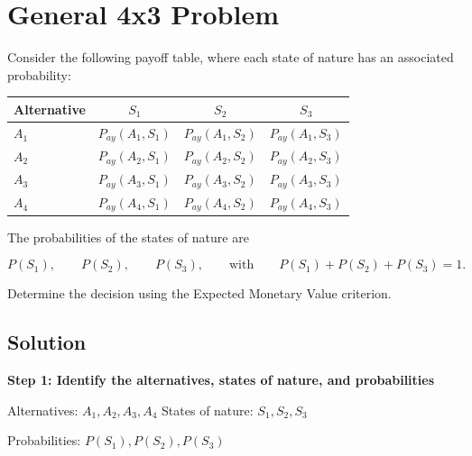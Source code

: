	\section{General 4x3 Problem}
	
	Consider the following payoff table, where each state of nature has an
	associated probability:
	
	\begin{center}
		\renewcommand{\arraystretch}{1.3}
		\begin{tabular}{lccc}
			\toprule
			Alternative & $S_1$ & $S_2$ & $S_3$ \\
			\midrule
		
			$A_1$
			& $P_{ay}(A_1,S_1)$
			& $P_{ay}(A_1,S_2)$
			& $P_{ay}(A_1,S_3)$
			\\
			
			$A_2$
			& $P_{ay}(A_2,S_1)$
			& $P_{ay}(A_2,S_2)$
			& $P_{ay}(A_2,S_3)$
			\\
			
			$A_3$
			& $P_{ay}(A_3,S_1)$
			& $P_{ay}(A_3,S_2)$
			& $P_{ay}(A_3,S_3)$
			\\
			
			$A_4$
			& $P_{ay}(A_4,S_1)$
			& $P_{ay}(A_4,S_2)$
			& $P_{ay}(A_4,S_3)$
			\\
			
			\bottomrule
		\end{tabular}
	\end{center}
	
	The probabilities of the states of nature are
	
	$$
	P(S_1), \qquad
	P(S_2), \qquad
	P(S_3),
	\qquad
	\text{with}
	\qquad 
	P(S_1)+P(S_2)+P(S_3)=1.
	$$
	
	Determine the decision using the Expected Monetary Value criterion.
	
	
	\subsection{Solution}
	
	\textbf{Step 1: Identify the alternatives, states of nature, and probabilities}
	
	Alternatives: $A_1, A_2, A_3, A_4$
	\qquad
	States of nature: $S_1, S_2, S_3$
	
	Probabilities:
	$
	P(S_1), P(S_2), P(S_3)
	$
	
